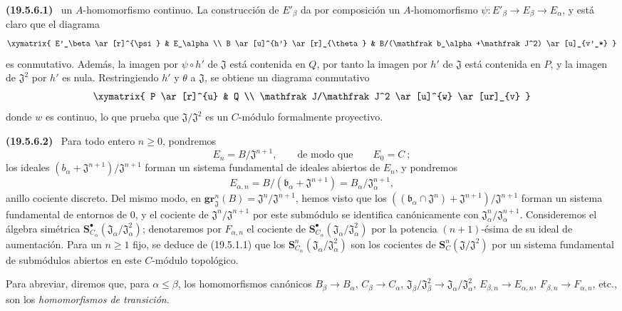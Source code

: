 \documentclass[10pt,oneside]{book}
\makeatletter
\newcommand{\setmanualcurrentlabel}[1]{\def\@currentlabel{#1}}
\newcommand{\oldpage}[2][]{%
  \setcounter{footnote}{0}%
  \marginpar{\scriptsize\textbf{#1}~|~#2}\ignorespaces}
\newenvironment{env}[1][]{\setmanualcurrentlabel{#1}\par\medskip\noindent\textbf{(#1)}\ }{\par}
\makeatother
\begin{document}
\begin{env}[19.5.6.1]
un $A$-homomorfismo continuo. La construcción de $E'_\beta$ da por
composición un $A$-homomorfismo $\psi:E'_\beta\to E_\beta\to E_\alpha$, y
está claro que el diagrama
\[
  \xymatrix{
    E'_\beta \ar[r]^{\psi} & E_\alpha \\
    B \ar[u]^{h'} \ar[r]_{\theta} &
    B/(\mathfrak b_\alpha+\mathfrak J^2) \ar[u]_{v'_*}
  }
\]
es conmutativo. Además, la imagen por $\psi\circ h'$ de $\mathfrak J$ está
contenida en $Q$, por tanto la imagen por $h'$ de $\mathfrak J$ está contenida en
$P$, y la imagen de $\mathfrak J^2$ por $h'$ es nula. Restringiendo $h'$ y
$\theta$ a $\mathfrak J$, se obtiene un diagrama conmutativo
\[
  \xymatrix{
    P \ar[r]^{u} & Q \\
    \mathfrak J/\mathfrak J^2 \ar[u]^{w} \ar[ur]_{v}
  }
\]
donde $w$ es continuo, lo que prueba que
$\mathfrak J/\mathfrak J^2$ es un $C$-módulo formalmente proyectivo.
\end{env}

\oldpage[0\textsubscript{IV-1}]{95}

\begin{env}[19.5.6.2]
\label{0.19.5.6.2-es}
Para todo entero $n\geq0$, pondremos
\[
  E_n=B/\mathfrak J^{n+1},
  \qquad\text{de modo que}\qquad E_0=C~;
\]
los ideales $(b_\alpha+\mathfrak J^{n+1})/\mathfrak J^{n+1}$ forman
un sistema fundamental de ideales abiertos de $E_n$, y pondremos
\[
  E_{\alpha,n}=B/(\mathfrak b_\alpha+\mathfrak J^{n+1})
  =B_\alpha/\mathfrak J_\alpha^{n+1},
\]
anillo cociente discreto. Del mismo modo, en
$\mathbf{gr}_{\mathfrak J}^n(B)=\mathfrak J^n/\mathfrak J^{n+1}$, hemos visto que los
$((\mathfrak b_\alpha\cap\mathfrak J^n)+\mathfrak J^{n+1})/
\mathfrak J^{n+1}$ forman un sistema fundamental de entornos de $0$, y el
cociente de $\mathfrak J^n/\mathfrak J^{n+1}$ por este submódulo se identifica
canónicamente con $\mathfrak J_\alpha^n/\mathfrak J_\alpha^{n+1}$. Consideremos
el álgebra simétrica
$\mathbf S_{C_\alpha}^\bullet(\mathfrak J_\alpha/\mathfrak J_\alpha^2)$; denotaremos
por $F_{\alpha,n}$ el cociente de
$\mathbf S_{C_\alpha}^\bullet(\mathfrak J_\alpha/\mathfrak J_\alpha^2)$ por la
potencia $(n+1)$-ésima de su ideal de aumentación. Para un $n\geq1$ fijo, se
deduce de (19.5.1.1) que los
$\mathbf S_{C_\alpha}^n(\mathfrak J_\alpha/\mathfrak J_\alpha^2)$ son los
cocientes de $\mathbf S_C^n(\mathfrak J/\mathfrak J^2)$ por un sistema
fundamental de submódulos abiertos en este $C$-módulo topológico.

Para abreviar, diremos que, para $\alpha\leq\beta$, los homomorfismos canónicos
$B_\beta\to B_\alpha$, $C_\beta\to C_\alpha$,
$\mathfrak J_\beta/\mathfrak J_\beta^2\to
\mathfrak J_\alpha/\mathfrak J_\alpha^2$, $E_{\beta,n}\to E_{\alpha,n}$,
$F_{\beta,n}\to F_{\alpha,n}$, etc., son los \emph{homomorfismos de
transición}.
\end{env}
\end{document}
